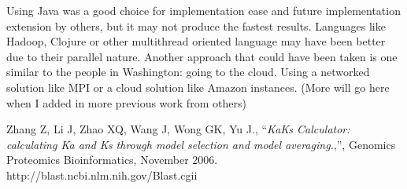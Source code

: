 \documentclass[12pt]{article}
\begin{document}
Using Java was a good choice for implementation ease and future implementation
extension by others, but it may not produce the fastest results. Languages
like Hadoop, Clojure or other multithread oriented language may have been better
due to their parallel nature. Another approach that could have been taken is one
similar to the people in Washington: going to the cloud. Using a networked 
solution like MPI or a cloud solution like Amazon instances. (More will go here
when I added in more previous work from others)

\begin{thebibliography}{1}
Zhang Z, Li J, Zhao XQ, Wang J, Wong GK, Yu J., ``\emph{KaKs Calculator: 
calculating Ka and Ks through model selection and model averaging.},'',
Genomics Proteomics Bioinformatics, November 2006.
http://blast.ncbi.nlm.nih.gov/Blast.cgii
\end{thebibliography}
\end{document}
